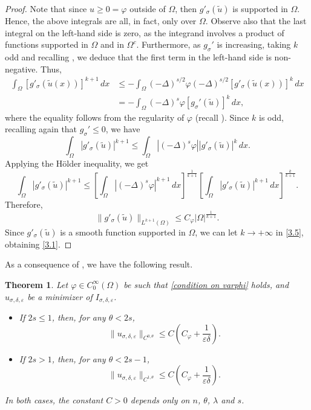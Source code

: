\documentclass[11pt, reqno]{amsart}
\newtheorem{theorem}{Theorem}
\numberwithin{equation}{section}
\numberwithin{theorem}{section}
\numberwithin{lemma}{section}
\numberwithin{corollary}{section}
\numberwithin{remark}{section}
\numberwithin{proposition}{section}
\numberwithin{definition}{section}
\begin{document}
\begin{proof}
Note that since $u\ge0=\varphi$ outside of $\Omega$, then $g'_\sigma(\tilde{u})$ is supported in $\Omega$. Hence, the above integrals are all, in fact, only over $\Omega$. Observe also that the last integral on the left-hand side is zero, as the integrand involves a product of functions supported in $\Omega$ and in $\Omega^c$. Furthermore, as $g_\sigma'$ is increasing, taking $k$ odd and recalling  , we deduce that the first term in the left-hand side is non-negative. Thus,
\begin{equation*}
    \begin{split}
        \int_{\Omega}[g'_\sigma(\tilde{u}(x))]^{k+1}\,dx&\le-\int_{\Omega}(-\Delta)^{s/2}\varphi(-\Delta)^{s/2}[g'_\sigma(\tilde{u}(x))]^k\,dx\\
        &=-\int_{\Omega}(-\Delta)^s\varphi[g_\sigma'(\tilde{u})]^k\,dx,
        \end{split}
\end{equation*}
where the equality follows from the regularity of $\varphi$ (recall ). Since $k$ is odd, recalling again that $g_\sigma'\le0$, we have
\begin{equation*}    
        \int_\Omega |g'_\sigma( \tilde{u})|^{k+1}\le\int_\Omega|(-\Delta)^s\varphi||g'_\sigma( \tilde{u})|^{k}\,dx.
\end{equation*}
Applying the H\"older inequality, we get
$$
\int_\Omega|g'_\sigma( \tilde{u})|^{k+1}\le \left[\int_\Omega|(-\Delta)^s\varphi|^{k+1}\,dx\right]^{\frac{1}{k+1}}
\left[\int_\Omega|g'_\sigma(\tilde{u})|^{k+1}\,dx\right]^{\frac{k}{k+1}}.
$$ 
Therefore,
\begin{equation}\label{3.5}
	\|g'_\sigma(\tilde{u})\|_{L^{k+1}(\Omega)}
	\le C_\varphi|\Omega|^{\frac{1}{k+1}}.
\end{equation}
Since $g'_\sigma(\tilde{u})$ is a smooth function supported in $\Omega$, we can let $k\rightarrow+\infty$ in \eqref{3.5}, obtaining \eqref{3.1}.
\end{proof}
As a consequence of , we have the following result.
 \begin{theorem}\label{t3.1}
	Let $\varphi\in C_0^\infty(\Omega)$ be such that \eqref{condition on varphi} holds, and $u_{\sigma,\delta,\varepsilon}$ be a minimizer of $I_{\sigma,\delta,\varepsilon}$.
	\begin{itemize}
		\item If $2 s \le 1$, then, for any $\theta<2s$, 
		\[
		\|u_{\sigma,\delta,\varepsilon}\|_{C^{0,\theta}}\le C \left(C_\varphi
		+\frac{1}{\varepsilon\delta}\right).
		\]
		
		\item If $2s>1$, then, for any $\theta<2s-1$,
		\[
		\|u_{\sigma,\delta,\varepsilon}\|_{C^{1,\theta}}\le C\left(C_\varphi
		+\frac{1}{\varepsilon\delta}\right).
		\]
	\end{itemize} In both cases, the constant $C>0$ depends only on $n$, $\theta$, $\lambda$ and $s$.
\end{theorem}
\end{document}
